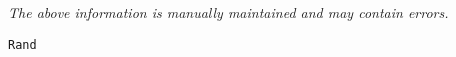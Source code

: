 \label{pkg:rand}

{\tiny \it The above information is manually maintained and may contain errors.}
\begin{verbatim}
Rand
\end{verbatim}
